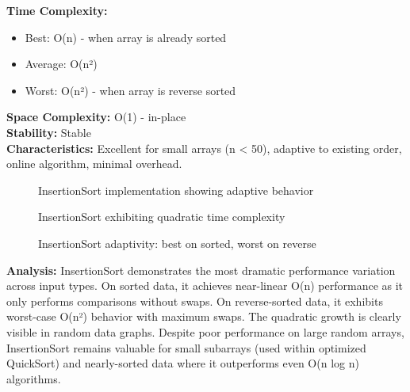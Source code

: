 \documentclass[12pt]{article}
\begin{document}
\textbf{Time Complexity:}
\begin{itemize}
    \item Best: O(n) - when array is already sorted
    \item Average: O(n²)
    \item Worst: O(n²) - when array is reverse sorted
\end{itemize}

\textbf{Space Complexity:} O(1) - in-place \\
\textbf{Stability:} Stable \\
\textbf{Characteristics:} Excellent for small arrays (n < 50), adaptive to existing order, online algorithm, minimal overhead.

\begin{figure}[H]
    \centering
    \caption{InsertionSort implementation showing adaptive behavior}
    \label{fig:insertion_impl}
\end{figure}

\begin{figure}[H]
    \centering
    \caption{InsertionSort exhibiting quadratic time complexity}
    \label{fig:insertion_quadratic}
\end{figure}

\begin{figure}[H]
    \centering
    \caption{InsertionSort adaptivity: best on sorted, worst on reverse}
    \label{fig:insertion_datatypes}
\end{figure}

\textbf{Analysis:} InsertionSort demonstrates the most dramatic performance variation across input types. On sorted data, it achieves near-linear O(n) performance as it only performs comparisons without swaps. On reverse-sorted data, it exhibits worst-case O(n²) behavior with maximum swaps. The quadratic growth is clearly visible in random data graphs. Despite poor performance on large random arrays, InsertionSort remains valuable for small subarrays (used within optimized QuickSort) and nearly-sorted data where it outperforms even O(n log n) algorithms.
\end{document}
